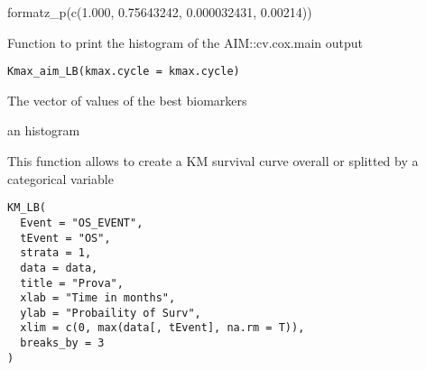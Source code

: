 \documentclass[a4paper]{book}
\begin{document}
%
\begin{Examples}
\begin{ExampleCode}
formatz_p(c(1.000, 0.75643242, 0.000032431, 0.00214))

\end{ExampleCode}
\end{Examples}
%
\begin{Description}
Function to print the histogram of the AIM::cv.cox.main output
\end{Description}
%
\begin{Usage}
\begin{verbatim}
Kmax_aim_LB(kmax.cycle = kmax.cycle)
\end{verbatim}
\end{Usage}
%
\begin{Arguments}
\begin{ldescription}
\item[\code{kmax.cycle}] The vector of values of the best biomarkers
\end{ldescription}
\end{Arguments}
%
\begin{Value}
an histogram
\end{Value}
%
\begin{Description}
This function allows to create a KM survival curve overall or splitted by a categorical variable
\end{Description}
%
\begin{Usage}
\begin{verbatim}
KM_LB(
  Event = "OS_EVENT",
  tEvent = "OS",
  strata = 1,
  data = data,
  title = "Prova",
  xlab = "Time in months",
  ylab = "Probaility of Surv",
  xlim = c(0, max(data[, tEvent], na.rm = T)),
  breaks_by = 3
)
\end{verbatim}
\end{Usage}
%
\end{document}

